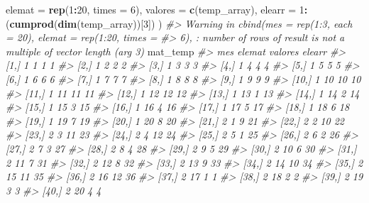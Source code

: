 \documentclass[]{book}
\newenvironment{Shaded}{\begin{snugshade}}{\end{snugshade}}
\newcommand{\KeywordTok}[1]{\textcolor[rgb]{0.13,0.29,0.53}{\textbf{#1}}}
\newcommand{\DataTypeTok}[1]{\textcolor[rgb]{0.13,0.29,0.53}{#1}}
\newcommand{\DecValTok}[1]{\textcolor[rgb]{0.00,0.00,0.81}{#1}}
\newcommand{\CommentTok}[1]{\textcolor[rgb]{0.56,0.35,0.01}{\textit{#1}}}
\newcommand{\OperatorTok}[1]{\textcolor[rgb]{0.81,0.36,0.00}{\textbf{#1}}}
\newcommand{\NormalTok}[1]{#1}
\begin{document}
\begin{Shaded}
\begin{Highlighting}[]
  \DataTypeTok{elemat =} \KeywordTok{rep}\NormalTok{(}\DecValTok{1}\OperatorTok{:}\DecValTok{20}\NormalTok{, }\DataTypeTok{times =} \DecValTok{6}\NormalTok{),}
  \DataTypeTok{valores =} \KeywordTok{c}\NormalTok{(temp_array),}
  \DataTypeTok{elearr =} \DecValTok{1}\OperatorTok{:}\NormalTok{(}\KeywordTok{cumprod}\NormalTok{(}\KeywordTok{dim}\NormalTok{(temp_array))[}\DecValTok{3}\NormalTok{])}
\NormalTok{)}
\CommentTok{#> Warning in cbind(mes = rep(1:3, each = 20), elemat = rep(1:20, times =}
\CommentTok{#> 6), : number of rows of result is not a multiple of vector length (arg 3)}
\NormalTok{mat_temp}
\CommentTok{#>        mes elemat valores elearr}
\CommentTok{#>   [1,]   1      1       1      1}
\CommentTok{#>   [2,]   1      2       2      2}
\CommentTok{#>   [3,]   1      3       3      3}
\CommentTok{#>   [4,]   1      4       4      4}
\CommentTok{#>   [5,]   1      5       5      5}
\CommentTok{#>   [6,]   1      6       6      6}
\CommentTok{#>   [7,]   1      7       7      7}
\CommentTok{#>   [8,]   1      8       8      8}
\CommentTok{#>   [9,]   1      9       9      9}
\CommentTok{#>  [10,]   1     10      10     10}
\CommentTok{#>  [11,]   1     11      11     11}
\CommentTok{#>  [12,]   1     12      12     12}
\CommentTok{#>  [13,]   1     13       1     13}
\CommentTok{#>  [14,]   1     14       2     14}
\CommentTok{#>  [15,]   1     15       3     15}
\CommentTok{#>  [16,]   1     16       4     16}
\CommentTok{#>  [17,]   1     17       5     17}
\CommentTok{#>  [18,]   1     18       6     18}
\CommentTok{#>  [19,]   1     19       7     19}
\CommentTok{#>  [20,]   1     20       8     20}
\CommentTok{#>  [21,]   2      1       9     21}
\CommentTok{#>  [22,]   2      2      10     22}
\CommentTok{#>  [23,]   2      3      11     23}
\CommentTok{#>  [24,]   2      4      12     24}
\CommentTok{#>  [25,]   2      5       1     25}
\CommentTok{#>  [26,]   2      6       2     26}
\CommentTok{#>  [27,]   2      7       3     27}
\CommentTok{#>  [28,]   2      8       4     28}
\CommentTok{#>  [29,]   2      9       5     29}
\CommentTok{#>  [30,]   2     10       6     30}
\CommentTok{#>  [31,]   2     11       7     31}
\CommentTok{#>  [32,]   2     12       8     32}
\CommentTok{#>  [33,]   2     13       9     33}
\CommentTok{#>  [34,]   2     14      10     34}
\CommentTok{#>  [35,]   2     15      11     35}
\CommentTok{#>  [36,]   2     16      12     36}
\CommentTok{#>  [37,]   2     17       1      1}
\CommentTok{#>  [38,]   2     18       2      2}
\CommentTok{#>  [39,]   2     19       3      3}
\CommentTok{#>  [40,]   2     20       4      4}

\end{Highlighting}
\end{Shaded}
\end{document}
